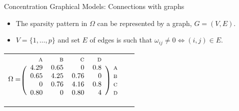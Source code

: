 \documentclass[xcolor=dvipsnames,aspectratio=1610]{beamer}
\newcommand{\matindex}[1]{\mbox{\scriptsize#1}}%
\theoremstyle{remark}
\begin{document}
  \begin{frame}{Concentration Graphical Models: Connections with graphs}
  \begin{itemize}
    \setlength{\itemsep}{16pt}
\item The sparsity pattern in $\Omega$ can be represented by a graph, $G = (V,E)$. 
\item $V=\{1,\dots,p\}$ and set $E$ of edges is such that  $\omega_{ij} \neq 0 \Leftrightarrow (i,j) \in E$. 
  \end{itemize}
  \begin{table}
    \centering
    \begin{tabular}{MM}
      $ \Omega = \begin{blockarray}{c@{\hspace{5pt}}rrrr@{\hspace{5pt}}cl}
          & \matindex{A} & \matindex{B} & \matindex{C} &  \matindex{D} & &\\
          \begin{block}{(c@{\hspace{5pt}}rrrr@{\hspace{5pt}}c)l}
            &  4.29 & 0.65 & 0 & 0.8 && \matindex{A} \\
            & 0.65  & 4.25 & 0.76 & 0 && \matindex{B} \\
            & 0 & 0.76 & 4.16 & 0.8 && \matindex{C} \\
	& 0.80 & 0 & 0.80 & 4 && \matindex{D} 	\\
          \end{block}
        \end{blockarray}
        $ &
    \end{tabular}
  \end{table}
\end{frame}
\end{document}
